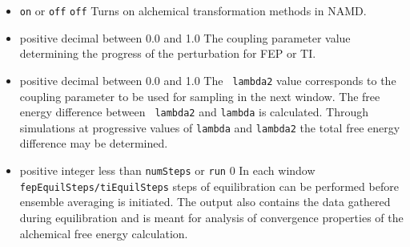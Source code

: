 \begin{itemize}
\item
 {{\tt on} or {\tt off}} {{\tt off}} {Turns on alchemical transformation methods in NAMD.}



\item
{} {positive
decimal between 0.0 and 1.0} {The coupling parameter value determining the
progress of the perturbation for FEP or TI.}

\item
{} {positive decimal between 0.0 and 1.0} {The {\tt
lambda2} value corresponds to the coupling parameter to be used for
sampling in the next window.  The free energy difference between {\tt
lambda2} and {\tt lambda} is calculated.  Through simulations
at progressive values of {\tt lambda} and {\tt lambda2} the
total free energy difference may be determined.}


\item
{}
{positive integer less than {\tt numSteps} or {\tt run}}
{0}
{In each window {\tt fepEquilSteps/tiEquilSteps} steps of equilibration can be
performed before ensemble averaging is initiated. The output also contains
the data gathered during equilibration and is meant for analysis of
convergence properties of the alchemical free energy calculation.}


\end{itemize}
